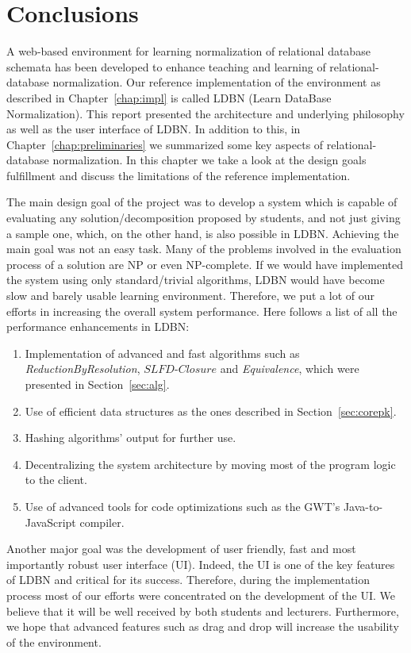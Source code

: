 \chapter{Conclusions}
\label{chap:conclusion}
A web-based environment for learning normalization of relational database schemata has been developed to
enhance teaching and learning of relational-database normalization. Our reference implementation of the 
environment as described in Chapter~\ref{chap:impl} is called LDBN (Learn DataBase Normalization). 
This report presented the architecture and underlying philosophy as well as the user interface of LDBN. 
In addition to this, in Chapter~\ref{chap:preliminaries}
we summarized some key aspects of relational-database normalization. 
In this chapter we take a look at the design goals fulfillment and discuss the limitations of 
the reference implementation.

The main design goal of the project was to develop a system which is capable of evaluating any 
solution/decomposition
proposed by students, and not just giving a sample one, which, on the other hand, is also possible
in LDBN. Achieving the main goal was not an easy task. Many of the problems involved
in the evaluation process of a solution are NP or even NP-complete. 
If we would have implemented the system using only standard/trivial algorithms, LDBN
would have become slow and barely usable learning environment. Therefore,
we put a lot of our efforts in increasing the overall system performance. Here follows a list
of all the performance enhancements in LDBN:
\begin{enumerate}
  \item Implementation of advanced and fast algorithms such as 
    \textit{ReductionByResolution}, $SLFD$-$Closure$ and \textit{Equivalence}, which were presented in Section~\ref{sec:alg}.
  \item Use of efficient data structures as the ones described in Section~\ref{sec:corepk}.
  \item Hashing algorithms' output for further use.
  \item Decentralizing the system architecture by moving most of the program logic to the client.
  \item Use of advanced tools for code optimizations such as the GWT's Java-to-JavaScript compiler.   
\end{enumerate}

Another major goal was the
development of user friendly, fast and most importantly robust
user interface (UI). Indeed, the UI is one of the key features of LDBN and critical for its
success. Therefore, during the implementation process 
most of our efforts were concentrated on the development of the UI. We believe that it will be well received 
by both students and lecturers.
Furthermore, we hope that advanced features such as drag and drop will 
increase the usability of the environment.


